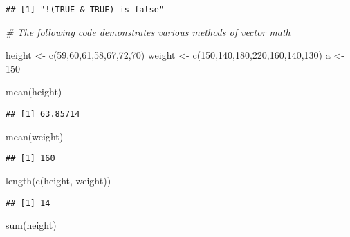 \documentclass[
]{article}
\newenvironment{Shaded}{\begin{snugshade}}{\end{snugshade}}
\newcommand{\CommentTok}[1]{\textcolor[rgb]{0.56,0.35,0.01}{\textit{#1}}}
\newcommand{\DecValTok}[1]{\textcolor[rgb]{0.00,0.00,0.81}{#1}}
\newcommand{\FunctionTok}[1]{\textcolor[rgb]{0.00,0.00,0.00}{#1}}
\newcommand{\NormalTok}[1]{#1}
\newcommand{\OtherTok}[1]{\textcolor[rgb]{0.56,0.35,0.01}{#1}}
\begin{document}
\begin{verbatim}
## [1] "!(TRUE & TRUE) is false"
\end{verbatim}

\begin{Shaded}
\begin{Highlighting}[]
\CommentTok{\# The following code demonstrates various methods of vector math}

\NormalTok{height }\OtherTok{\textless{}{-}} \FunctionTok{c}\NormalTok{(}\DecValTok{59}\NormalTok{,}\DecValTok{60}\NormalTok{,}\DecValTok{61}\NormalTok{,}\DecValTok{58}\NormalTok{,}\DecValTok{67}\NormalTok{,}\DecValTok{72}\NormalTok{,}\DecValTok{70}\NormalTok{)}
\NormalTok{weight }\OtherTok{\textless{}{-}} \FunctionTok{c}\NormalTok{(}\DecValTok{150}\NormalTok{,}\DecValTok{140}\NormalTok{,}\DecValTok{180}\NormalTok{,}\DecValTok{220}\NormalTok{,}\DecValTok{160}\NormalTok{,}\DecValTok{140}\NormalTok{,}\DecValTok{130}\NormalTok{)}
\NormalTok{a }\OtherTok{\textless{}{-}} \DecValTok{150}

\FunctionTok{mean}\NormalTok{(height)}
\end{Highlighting}
\end{Shaded}

\begin{verbatim}
## [1] 63.85714
\end{verbatim}

\begin{Shaded}
\begin{Highlighting}[]
\FunctionTok{mean}\NormalTok{(weight)}
\end{Highlighting}
\end{Shaded}

\begin{verbatim}
## [1] 160
\end{verbatim}

\begin{Shaded}
\begin{Highlighting}[]
\FunctionTok{length}\NormalTok{(}\FunctionTok{c}\NormalTok{(height, weight))}
\end{Highlighting}
\end{Shaded}

\begin{verbatim}
## [1] 14
\end{verbatim}

\begin{Shaded}
\begin{Highlighting}[]
\FunctionTok{sum}\NormalTok{(height)}
\end{Highlighting}
\end{Shaded}
\end{document}

